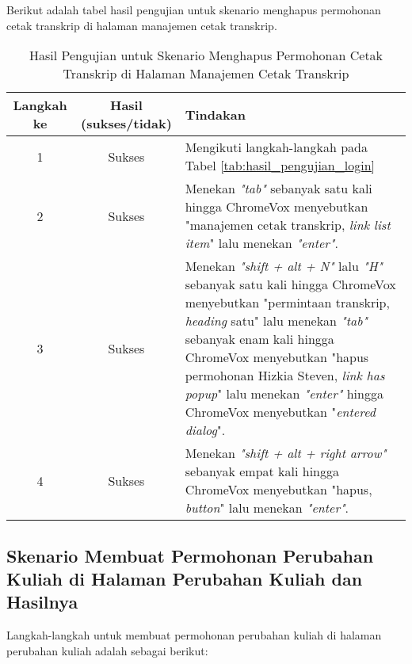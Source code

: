 Berikut adalah tabel hasil pengujian untuk skenario menghapus permohonan cetak transkrip di halaman manajemen cetak transkrip.

\begin{table}[H]
    \centering 
    \caption{Hasil Pengujian untuk Skenario Menghapus Permohonan Cetak Transkrip di Halaman Manajemen Cetak Transkrip}
    \label{tab:hasil_pengujian_menghapus_permohonan_cetak_transkrip_di_halaman_manajemen_cetak_transkrip}
    \begin{tabular}{|c|c|p{10cm}|}
        \toprule
        Langkah ke & Hasil (sukses/tidak) & Tindakan \\

        \midrule
        1 & Sukses & Mengikuti langkah-langkah pada Tabel \ref{tab:hasil_pengujian_login} \\
        2 & Sukses & Menekan \textit{"tab"} sebanyak satu kali hingga ChromeVox menyebutkan "manajemen cetak transkrip, \textit{link list item}" lalu menekan \textit{"enter"}. \\
        3 & Sukses & Menekan \textit{"shift + alt + N"} lalu \textit{"H"} sebanyak satu kali hingga ChromeVox menyebutkan "permintaan transkrip, \textit{heading} satu" lalu menekan \textit{"tab"} sebanyak enam kali hingga ChromeVox menyebutkan "hapus permohonan Hizkia Steven, \textit{link has popup}" lalu menekan \textit{"enter"} hingga ChromeVox menyebutkan "\textit{entered dialog}". \\
        4 & Sukses & Menekan \textit{"shift + alt + right arrow"} sebanyak empat kali hingga ChromeVox menyebutkan "hapus, \textit{button}" lalu menekan \textit{"enter"}. \\ 

        \bottomrule

    \end{tabular}
\end{table}

\subsection{Skenario Membuat Permohonan Perubahan Kuliah di Halaman Perubahan Kuliah dan Hasilnya}
\label{subsec:skenario_membuat_permohonan_perubahan_kuliah_di_halaman_perubahan_kuliah}
Langkah-langkah untuk membuat permohonan perubahan kuliah di halaman perubahan kuliah adalah sebagai berikut:

